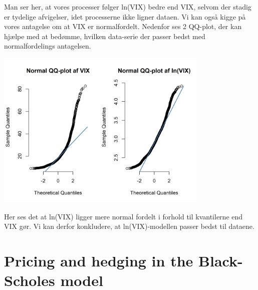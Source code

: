 \documentclass{article}
\theoremstyle{definition}
\theoremstyle{remark}
\begin{document}
Man ser her, at vores processer følger ln(VIX) bedre end VIX, selvom der stadig er tydelige afvigelser, idet processerne ikke ligner dataen. Vi kan også kigge på vores antagelse om at VIX er normalfordelt. Nedenfor ses 2 QQ-plot, der kan hjælpe med at bedømme, hvilken data-serie der passer bedst med normalfordelings antagelsen.
\begin{center}
    \includegraphics[width=4in]{QQ_VIX_vs_lnVIX}
\end{center}
Her ses det at ln(VIX) ligger mere normal fordelt i forhold til kvantilerne end VIX gør. Vi kan derfor konkludere, at ln(VIX)-modellen passer bedst til dataene.
\section{Pricing and hedging in the Black-Scholes model}
\end{document}
